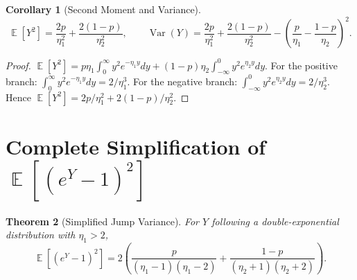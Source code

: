 \documentclass[11pt,a4paper,openany]{book}
\theoremstyle{definition}
\theoremstyle{plain}
\newtheorem{theorem}{Theorem}[chapter]
\newtheorem{corollary}[theorem]{Corollary}
\theoremstyle{remark}
\DeclareMathOperator{\E}{\mathbb{E}}
\DeclareMathOperator{\Var}{Var}
\newcommand{\1}{\mathbbm{1}}
\begin{document}
\begin{corollary}[Second Moment and Variance]
\[
\E[Y^{2}] = \frac{2p}{\eta_{1}^{2}} + \frac{2(1-p)}{\eta_{2}^{2}}, \qquad
\Var(Y) = \frac{2p}{\eta_{1}^{2}} + \frac{2(1-p)}{\eta_{2}^{2}} - \left(\frac{p}{\eta_{1}} - \frac{1-p}{\eta_{2}}\right)^{2}.
\]
\end{corollary}

\begin{proof}
$\E[Y^{2}] = p \eta_{1} \int_{0}^{\infty} y^{2} e^{-\eta_{1} y} dy + (1-p) \eta_{2} \int_{-\infty}^{0} y^{2} e^{\eta_{2} y} dy$. For the positive branch: $\int_{0}^{\infty} y^{2} e^{-\eta_{1} y} dy = 2/\eta_{1}^{3}$. For the negative branch: $\int_{-\infty}^{0} y^{2} e^{\eta_{2} y} dy = 2/\eta_{2}^{3}$. Hence $\E[Y^{2}] = 2p/\eta_{1}^{2} + 2(1-p)/\eta_{2}^{2}$.
\end{proof}

\section{Complete Simplification of $\E[(e^{Y} - 1)^{2}]$}

\begin{theorem}[Simplified Jump Variance]
For $Y$ following a double-exponential distribution with $\eta_{1} > 2$,
\[
\boxed{\E[(e^{Y} - 1)^{2}] = 2\left(\frac{p}{(\eta_{1} - 1)(\eta_{1} - 2)} + \frac{1-p}{(\eta_{2} + 1)(\eta_{2} + 2)}\right)}.
\]
\end{theorem}
\end{document}
